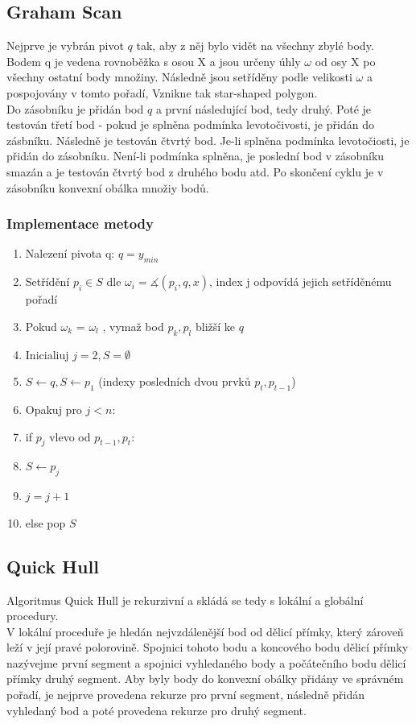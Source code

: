 \documentclass[a4paper, 12pt]{article}
\begin{document}
\subsection{Graham Scan}
Nejprve je vybrán pivot $q$ tak, aby z něj bylo vidět na všechny zbylé body. Bodem q je vedena rovnoběžka s osou X a jsou určeny úhly $\omega$ od osy X po všechny ostatní body množiny. Následně jsou setříděny podle velikosti $\omega$ a pospojovány  v tomto pořadí, Vznikne tak star-shaped polygon.\\
Do zásobníku je přidán bod $q$ a první následující bod, tedy druhý. Poté je testován třetí bod - pokud je splněna podmínka levotočivosti, je přidán do zásbníku. Následně je testován čtvrtý bod. Je-li splněna podmínka levotočiosti, je přidán do zásobníku. Není-li podmínka splněna, je poslední bod v zásobníku smazán a je testován čtvrtý bod z druhého bodu atd. Po skončení cyklu je v zásobníku konvexní obálka množiy bodů.\\

\subsubsection{Implementace metody}
\begin{enumerate}
	\item Nalezení pivota q:  $ q = y_{min} $ 
	\item Setřídění $ p_i \in S$  dle $\omega_i = \measuredangle (p_i, q, x)$, index j odpovídá jejich setříděnému pořadí
	\item Pokud $\omega_k$ = $\omega_l$ , vymaž bod $p_k,p_l$ bližší ke $q$
	\item Inicialiuj $j = 2, S = \emptyset$
	\item $S \longleftarrow q, S \longleftarrow p_1$ (indexy posledních dvou prvků $p_t, p_{t-1}$) 
	\item Opakuj pro $j < n:$
	\item \hspace {1cm} if $p_j$ vlevo od $p_{t-1}, p_t:$
	\item \hspace {1.5cm} $S \longleftarrow p_j $
	\item  \hspace {1.5cm} $j = j + 1$
	\item \hspace {1cm} else pop $S$	
\end{enumerate}


\clearpage

\subsection{Quick Hull}
Algoritmus Quick Hull je rekurzivní a skládá se tedy s lokální a globální procedury.\\
V lokální proceduře je hledán nejvzdálenější bod od dělicí přímky, který zároveň leží v její pravé polorovině. Spojnici tohoto bodu a koncového bodu dělicí přímky nazývejme první segment a spojnici vyhledaného body a počátečního bodu dělicí přímky druhý segment. Aby byly body do konvexní obálky přidány ve správném pořadí, je nejprve provedena rekurze pro první segment, následně přidán vyhledaný bod a poté provedena rekurze pro druhý segment.
\end{document}
